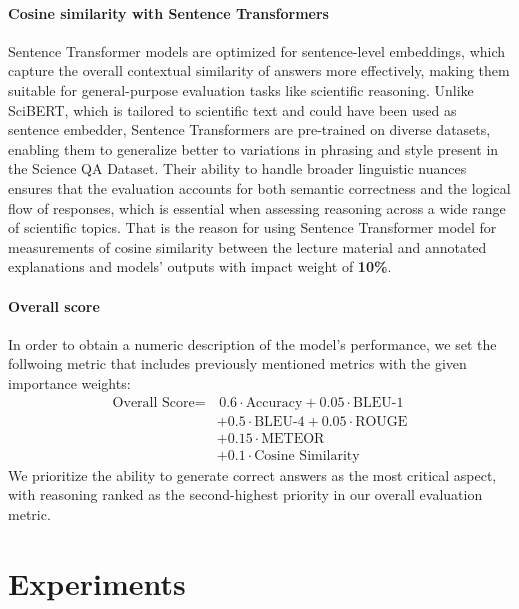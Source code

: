 \documentclass{article}
\begin{document}
\paragraph{Cosine similarity with Sentence Transformers}
Sentence Transformer models are optimized for sentence-level embeddings, which capture the overall contextual similarity of answers more effectively, making them suitable for general-purpose evaluation tasks like scientific reasoning.
Unlike SciBERT, which is tailored to scientific text and could have been used as sentence embedder, Sentence Transformers are pre-trained on diverse datasets, enabling them to generalize better to variations in phrasing and style present in the Science QA Dataset.
Their ability to handle broader linguistic nuances ensures that the evaluation accounts for both semantic correctness and the logical flow of responses, which is essential when assessing reasoning across a wide range of scientific topics. That is the reason for using Sentence Transformer model for measurements of cosine similarity between the lecture material and annotated explanations and models' outputs with impact weight of \textbf{10\%}.

\paragraph{Overall score}
In order to obtain a numeric description of the model's performance, we set the follwoing metric that includes previously mentioned metrics with the given importance weights:
\begin{equation*}
\begin{split}
\text{Overall Score} = & \, 0.6 \cdot \text{Accuracy} + 0.05 \cdot \text{BLEU-1} \\
& + 0.5 \cdot \text{BLEU-4} + 0.05 \cdot \text{ROUGE} \\
& + 0.15 \cdot \text{METEOR} \\
& + 0.1 \cdot \text{Cosine Similarity}
\end{split}
\end{equation*}
We prioritize the ability to generate correct answers as the most critical aspect, with reasoning ranked as the second-highest priority in our overall evaluation metric.




\section{Experiments}
\label{experiments}
\end{document}
